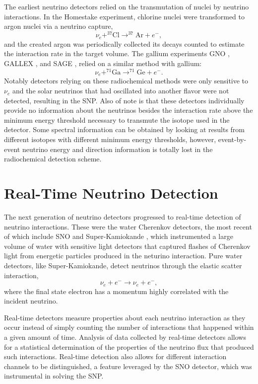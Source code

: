 The earliest neutrino detectors relied on the transmutation of nuclei by neutrino interactions. 
In the Homestake \cite{homestake} experiment, chlorine nuclei were transformed to argon nuclei via a neutrino capture,
\begin{equation}
\nu_e + ^{37}\mathrm{Cl} \rightarrow ^{37}\mathrm{Ar} + e^-,
\end{equation}
and the created argon was periodically collected its decays counted to estimate the interaction rate in the target volume.
The gallium experiments GNO \cite{gno}, GALLEX \cite{gallex}, and SAGE \cite{sagecombo}, relied on a similar method with gallium:
\begin{equation}
\nu_e + ^{71}\mathrm{Ga} \rightarrow ^{71}\mathrm{Ge} + e^-.
\end{equation}
Notably detectors relying on these radiochemical methods were only sensitive to $\nu_e$ and the solar neutrinos that had oscillated into another flavor were not detected, resulting in the SNP.
Also of note is that these detectors individually provide no information about the neutrinos besides the interaction rate above the minimum energy threshold necessary to transmute the isotope used in the detector. 
Some spectral information can be obtained by looking at results from different isotopes with different minimum energy thresholds, however, event-by-event neutrino energy and direction information is totally lost in the radiochemical detection scheme.

\section{Real-Time Neutrino Detection}

The next generation of neutrino detectors progressed to real-time detection of neutrino interactions.
These were the water Cherenkov detectors, the most recent of which include SNO \cite{3phase} and Super-Kamiokande \cite{superk}, which instrumented a large volume of water with sensitive light detectors that captured flashes of Cherenkov light from energetic particles produced in the neturino interaction.
Pure water detectors, like Super-Kamiokande, detect neutrinos through the elastic scatter interaction,
\begin{equation}
\nu_e + e^- \rightarrow \nu_e + e^-,
\end{equation}
where the final state electron has a momentum highly correlated with the incident neutrino.

Real-time detectors measure properties about each neutrino interaction as they occur instead of simply counting the number of interactions that happened within a given amount of time.
Analysis of data collected by real-time detectors allows for a statistical determination of the properties of the neutrino flux that produced such interactions.
Real-time detection also allows for different interaction channels to be distinguished, a feature leveraged by the SNO detector, which was instrumental in solving the SNP.

